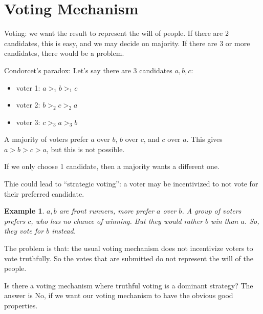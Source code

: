 \documentclass[twoside]{article}
\newtheorem{protoexample}[prototheorem]{Example}
\newenvironment{example}
{\colorlet{shadecolor}{red!15}\begin{shaded}\begin{protoexample}\normalfont}
		{\end{protoexample}\end{shaded}}
\begin{document}
	\section{Voting Mechanism}
	Voting: we want the result to represent the will of people. If there are 2 candidates, this is easy, and we may decide on majority. If there are 3 or more candidates, there would be a problem. 
	
	Condorcet's paradox: Let's say there are 3 candidates $a, b, c$: \begin{itemize}
	\item voter 1: $a >_1 b >_1 c$
	\item voter 2: $b >_2 c >_2 a$
	\item voter 3: $c >_3 a >_3 b$
	\end{itemize}
	A majority of voters prefer $a$ over $b$, $b$ over $c$, and $c$ over $a$. This gives $a > b > c >a$, but this is not possible. 
	
	If we only choose 1 candidate, then a majority wants a different one. 
	
	Thie could lead to ``strategic voting'': a voter may be incentivized to not vote for their preferred candidate. 
	
	\begin{example}
		$a, b$ are front runners, more prefer $a$ over $b$. A group of voters prefers $c$, who has no chance of winning. But they would rather $b$ win than $a$. So, they vote for $b$ instead. 
	\end{example}
	
	The problem is that: the usual voting mechanism does not incentivize voters to vote truthfully. So the votes that are submitted do not represent the will of the people. 
	
	Is there a voting mechanism where truthful voting is a dominant strategy? The answer is No, if we want our voting mechanism to have the obvious good properties. 
	
\end{document}
